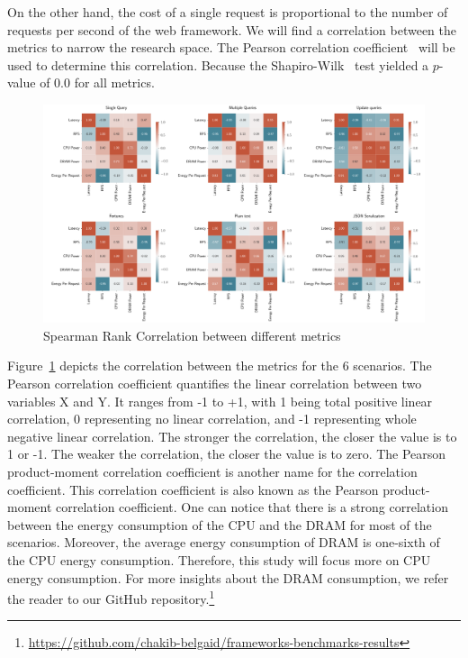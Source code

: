 On the other hand, the cost of a single request is proportional to the number of requests per second of the web framework.
We will find a correlation between the metrics to narrow the research space.
The Pearson correlation coefficient~\cite{zar2005spearman} will be used to determine this correlation.
Because the Shapiro-Wilk~\cite{shapiro1968comparative} test yielded a $p$-value of 0.0 for all metrics.
\begin{figure}[htb]
    \centering
    \includegraphics[width=\textwidth]{imgs/correlation_all}
    \caption{Spearman Rank Correlation between different metrics}
    \label{fig:correlation}
\end{figure}

Figure~\ref{fig:correlation} depicts the correlation between the metrics for the 6 scenarios.
The Pearson correlation coefficient quantifies the linear correlation between two variables X and Y.
It ranges from -1 to +1, with 1 being total positive linear correlation, 0 representing no linear correlation, and -1 representing whole negative linear correlation.
The stronger the correlation, the closer the value is to 1 or -1.
The weaker the correlation, the closer the value is to zero.
The Pearson product-moment correlation coefficient is another name for the correlation coefficient.
This correlation coefficient is also known as the Pearson product-moment correlation coefficient.
One can notice that there is a strong correlation between the energy consumption of the CPU and the DRAM for most of the scenarios.
Moreover, the average energy consumption of DRAM is one-sixth of the CPU energy consumption.
Therefore, this study will focus more on CPU energy consumption.
For more insights about the DRAM consumption, we refer the reader to our GitHub repository.\footnote{\url{https://github.com/chakib-belgaid/frameworks-benchmarks-results}}

